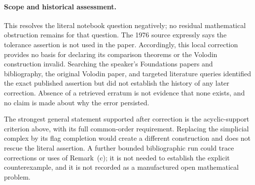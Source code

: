 \paragraph{Scope and historical assessment.}
This resolves the literal notebook question negatively; no residual
mathematical obstruction remains for that question. The 1976 source
expressly says the tolerance assertion is not used in the paper.
Accordingly, this local correction provides no basis for declaring its
comparison theorems or the Volodin construction invalid. Searching the
speaker's Foundations papers and bibliography, the original Volodin
paper, and targeted literature queries identified the exact published
assertion but did not establish the history of any later correction.
Absence of a retrieved erratum is not evidence that none exists, and no
claim is made about why the error persisted.

The strongest general statement supported after correction is the
acyclic-support criterion above, with its full common-order requirement.
Replacing the simplicial complex by its flag completion would create a
different construction and does not rescue the literal assertion.
A further bounded bibliographic run could trace corrections or uses of
Remark~(c); it is not needed to establish the explicit counterexample,
and it is not recorded as a manufactured open mathematical problem.
